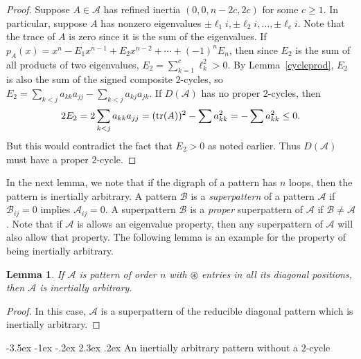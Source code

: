 \documentclass[10pt]{amsart}
\newtheorem{lemma}[proposition]{Lemma}
\begin{document}
\begin{proof} 
Suppose $A\in {\mathcal{A}}$ has refined inertia $(0,0,n-2c,2c)$ for some $c\geq 1$.
In particular, suppose $A$ has nonzero eigenvalues $\pm \ell_1i,\pm \ell_2i,\ldots,\pm \ell_ci$.
Note that the trace of $A$ is zero since it is the sum of the eigenvalues. If 
$p_A(x)=x^n-E_1x^{n-1}+E_2x^{n-2}+\cdots+(-1)^nE_n$, then
since  $E_2$ is the sum of all products of two eigenvalues, $E_2=\sum\limits^c_{k=1} \ell_k^2 >0$.
By Lemma~\ref{cycleprod},  $E_2$ is also the sum of the signed composite $2$-cycles, so
$E_2=\sum\limits_{k<j} a_{kk}a_{jj} - \sum\limits_{k<j} a_{kj}a_{jk}$. 
If $D({\mathcal{A}})$ has no proper $2$-cycles, then 
$$2E_2=2\sum\limits_{k<j} a_{kk}a_{jj}=({\rm{tr}}(A))^2-\sum a_{kk}^2=-\sum a_{kk}^2\leq 0.$$
But this would contradict the fact that $E_2>0$ as noted earlier. Thus $D({\mathcal{A}})$ must have
a proper $2$-cycle.
\end{proof}

In the next lemma, we note that if the digraph of a pattern has $n$ loops, then the pattern is inertially arbitrary. A pattern ${\mathcal{B}}$
is a \emph{superpattern} of a pattern ${\mathcal{A}}$ if ${\mathcal{B}}_{ij}=0$ implies ${\mathcal{A}}_{ij}=0$. A superpattern ${\mathcal{B}}$ is a
\emph{proper} superpattern of ${\mathcal{A}}$ if ${\mathcal{B}}\neq {\mathcal{A}}$. Note that if ${\mathcal{A}}$ is allows an eigenvalue property, then any superpattern
of ${\mathcal{A}}$ will also allow that property. The following lemma is an example for the property of
being inertially arbitrary.

\begin{lemma}\label{iapdiagonal}
If ${\mathcal{A}}$ is 
pattern of order $n$ with ${\circledast}$ entries in all its diagonal positions, then ${\mathcal{A}}$ is inertially arbitrary.
\end{lemma}

\begin{proof}
In this case, ${\mathcal{A}}$ is a superpattern of the reducible diagonal pattern which is inertially arbitrary.
\end{proof}

{               
                                      {-3.5ex \@plus -1ex \@minus -.2ex}                                      {2.3ex \@plus.2ex}                                                      {\normalfont\bfseries}}{An inertially arbitrary pattern without a $2$-cycle}\label{withou}
\end{document}

